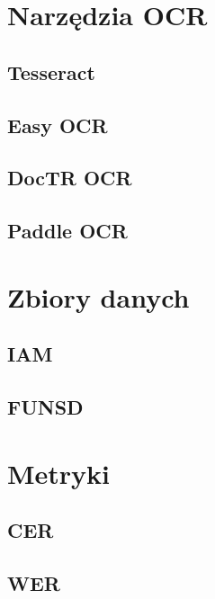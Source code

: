\label{chapter:related}
\raggedright

\section{Narzędzia OCR}\label{chapter:podrozdzial}


\subsection{Tesseract}


\subsection{Easy OCR}


\subsection{DocTR OCR}


\subsection{Paddle OCR}


\section{Zbiory danych}


\subsection{IAM}


\subsection{FUNSD}


\section{Metryki}


\subsection{CER}


\subsection{WER}

